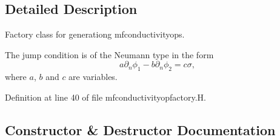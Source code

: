 \subsection{Detailed Description}
Factory class for generationg mfconductivityop\textquotesingle{}s. 

The jump condition is of the Neumann type in the form \[ a\partial_n\phi_1 - b\partial_n\phi_2 = c\sigma, \] where $a$, $b$ and $c$ are variables. 

Definition at line 40 of file mfconductivityopfactory.\+H.



\subsection{Constructor \& Destructor Documentation}
